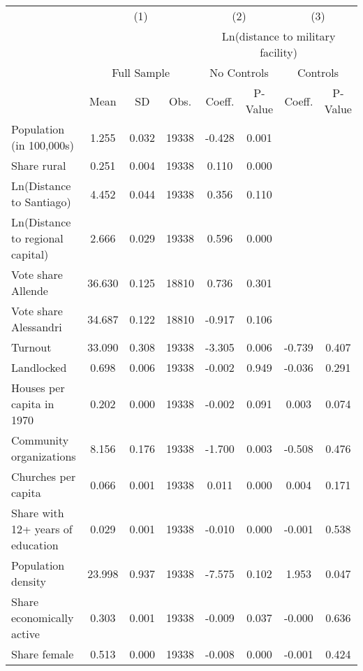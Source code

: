 
\begin{tabular}{l*{7}{c}}
\hline\hline
 & \multicolumn{3}{c}{(1)} & \multicolumn{2}{c}{(2)} & \multicolumn{2}{c}{(3)} \\
 & & & & \multicolumn{4}{c}{Ln(distance to military facility)} \\
 & \multicolumn{3}{c}{Full Sample} & \multicolumn{2}{c}{No Controls} & \multicolumn{2}{c}{Controls} \\
 & Mean & SD & Obs. & Coeff. & P-Value & Coeff. & P-Value \\
\hline
Population (in 100,000s) &     1.255 &     0.032 & 19338 &    -0.428 & 0.001\sym{**} &  &  \\
Share rural &     0.251 &     0.004 & 19338 &     0.110 & 0.000\sym{***} &  &  \\
Ln(Distance to Santiago) &     4.452 &     0.044 & 19338 &     0.356 & 0.110  &  &  \\
Ln(Distance to regional capital) &     2.666 &     0.029 & 19338 &     0.596 & 0.000\sym{***} &  &  \\
Vote share Allende &    36.630 &     0.125 & 18810 &     0.736 & 0.301  &  &  \\
Vote share Alessandri &    34.687 &     0.122 & 18810 &    -0.917 & 0.106  &  &  \\
Turnout &    33.090 &     0.308 & 19338 &    -3.305 & 0.006\sym{**} &    -0.739 & 0.407  \\
Landlocked &     0.698 &     0.006 & 19338 &    -0.002 & 0.949  &    -0.036 & 0.291  \\
Houses per capita in 1970 &     0.202 &     0.000 & 19338 &    -0.002 & 0.091  &     0.003 & 0.074  \\
Community organizations &     8.156 &     0.176 & 19338 &    -1.700 & 0.003\sym{**} &    -0.508 & 0.476  \\
Churches per capita &     0.066 &     0.001 & 19338 &     0.011 & 0.000\sym{***} &     0.004 & 0.171  \\
Share with 12+ years of education &     0.029 &     0.001 & 19338 &    -0.010 & 0.000\sym{***} &    -0.001 & 0.538  \\
Population density &    23.998 &     0.937 & 19338 &    -7.575 & 0.102  &     1.953 & 0.047\sym{*} \\
Share economically active &     0.303 &     0.001 & 19338 &    -0.009 & 0.037\sym{*} &    -0.000 & 0.636  \\
Share female &     0.513 &     0.000 & 19338 &    -0.008 & 0.000\sym{***} &    -0.001 & 0.424  \\

\end{tabular}
